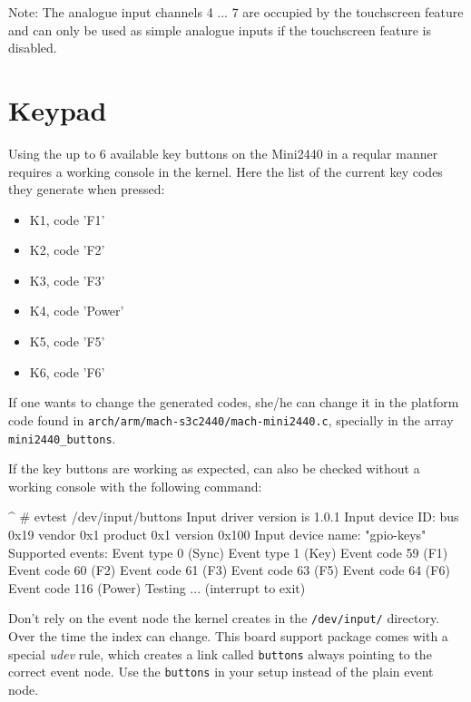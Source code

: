 Note: The analogue input channels 4 ... 7 are occupied by the touchscreen
feature and can only be used as simple analogue inputs if the touchscreen
feature is disabled.


\section{Keypad}						\label{sec:ADC}

Using the up to 6 available key buttons on the Mini2440 in a reqular manner
requires a working console in the kernel. Here the list of the current key codes
they generate when pressed:

\begin{itemize}
	\item K1, code 'F1'
	\item K2, code 'F2'
	\item K3, code 'F3'
	\item K4, code 'Power'
	\item K5, code 'F5'
	\item K6, code 'F6'
\end{itemize}

If one wants to change the generated codes, she/he can change it in the
platform code found in \texttt{arch/arm/mach-s3c2440/mach-mini2440.c},
specially in the array \texttt{mini2440\_buttons}.

If the key buttons are working as expected, can also be checked without a
working console with the following command:

\begin{ptxshell}[escapechar=|]{^}
# evtest /dev/input/buttons
Input driver version is 1.0.1
Input device ID: bus 0x19 vendor 0x1 product 0x1 version 0x100
Input device name: "gpio-keys"
Supported events:
  Event type 0 (Sync)
  Event type 1 (Key)
    Event code 59 (F1)
    Event code 60 (F2)
    Event code 61 (F3)
    Event code 63 (F5)
    Event code 64 (F6)
    Event code 116 (Power)
Testing ... (interrupt to exit)
\end{ptxshell}

\begin{important}
Don't rely on the event node the kernel creates in the \texttt{/dev/input/}
directory. Over the time the index can change. This board support package comes
with a special \textit{udev} rule, which creates a link called \texttt{buttons}
always pointing to the correct event node. Use the \texttt{buttons} in your
setup instead of the plain event node.
\end{important}

